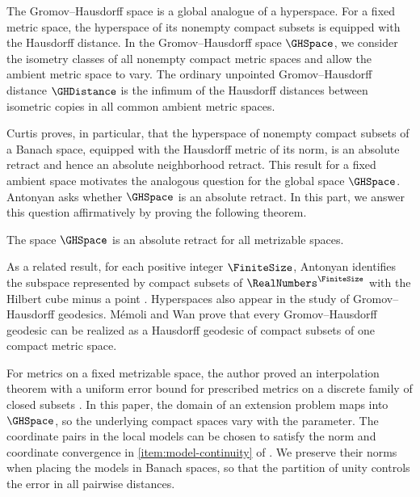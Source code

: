 The Gromov--Hausdorff space is a global analogue of a hyperspace.
For a fixed metric space,
the hyperspace of its nonempty compact subsets is equipped with the
Hausdorff distance.
In the Gromov--Hausdorff space
$\GHSpace$,
we consider the isometry classes of all nonempty compact metric spaces
and allow the ambient metric space to vary.
The ordinary unpointed
Gromov--Hausdorff distance
$\GHDistance$
is the infimum of the Hausdorff distances between isometric copies
in all common ambient metric spaces.



Curtis
\cite[Theorem~1.6]{Curtis1980}
proves,
in particular,
that the hyperspace of nonempty compact subsets of a Banach space,
equipped with the Hausdorff metric of its norm,
is an absolute retract and hence an absolute neighborhood retract.
This result for a fixed ambient space motivates the analogous question
for the global space
$\GHSpace$.
Antonyan
\cite[p.~2]{Antonyan2020Euclidean}
asks whether
$\GHSpace$
is an absolute retract.
In this part,
we answer this question affirmatively by proving the following theorem.

\begin{theorem}\label{thm:part-iii-main}
The space
$\GHSpace$
is an absolute retract for all metrizable spaces.
\end{theorem}



As a related result,
for each positive integer
$\FiniteSize$,
Antonyan identifies the subspace represented by compact subsets of
$\RealNumbers^\FiniteSize$
with the Hilbert cube minus a point
\cite[Corollary~5.3]{Antonyan2021Euclidean}.
Hyperspaces also appear in the study of Gromov--Hausdorff geodesics.
M\'emoli and Wan
\cite[arXiv v2, Theorem~1]{MemoliWan2023}
prove that every Gromov--Hausdorff geodesic can be realized as a Hausdorff
geodesic of compact subsets of one compact metric space.

For metrics on a fixed metrizable space,
the author proved an interpolation theorem with a uniform error bound
for prescribed metrics on a discrete family of closed subsets
\cite[Theorem~1.1]{Ishiki2026Interpolation}.
In this paper,
the domain of an extension problem maps into
$\GHSpace$,
so the underlying compact spaces vary with the parameter.
The coordinate pairs in the local models can be chosen to satisfy
the norm and coordinate convergence in \ref{item:model-continuity}
of .
We preserve their norms when placing the models in Banach spaces,
so that the partition of unity controls the error in all pairwise distances.


